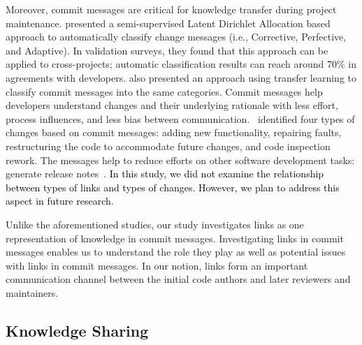 \documentclass[smallextended]{svjour3}       %
\newcommand{\fix}[1]{\textcolor{black}{#1}}
\begin{document}
Moreover, commit messages are critical for knowledge transfer during project maintenance. \cite{fu2015automated} presented a semi-supervised Latent Dirichlet Allocation based approach to automatically classify change messages (i.e., Corrective, Perfective, and Adaptive). In validation surveys, they found that this approach can be applied to cross-projects; automatic classification results can reach around 70\% in agreements with developers.
\cite{sarwar2020multi} also presented an approach using transfer learning to classify commit messages into the same categories. Commit messages help developers understand changes and their underlying rationale with less effort, process influences, and less bias between communication.~\cite{mockus2000identifying} identified four types of changes based on commit messages: adding new functionality, repairing faults, restructuring the code to accommodate future changes, and code inspection rework. The messages help to reduce efforts on other software development tasks: generate release notes~\citep{moreno2014automatic}. \fix{In this study, we did not examine the relationship between types of links and types of changes. However, we plan to address this aspect in future research. }



Unlike the aforementioned studies, our study investigates links as one representation of knowledge in commit messages. Investigating links in commit messages enables us to understand the role they play as well as potential issues with links in commit messages.
In our notion, links form an important communication channel between the initial code authors and later reviewers and maintainers.


\subsection{Knowledge Sharing}
\end{document}
